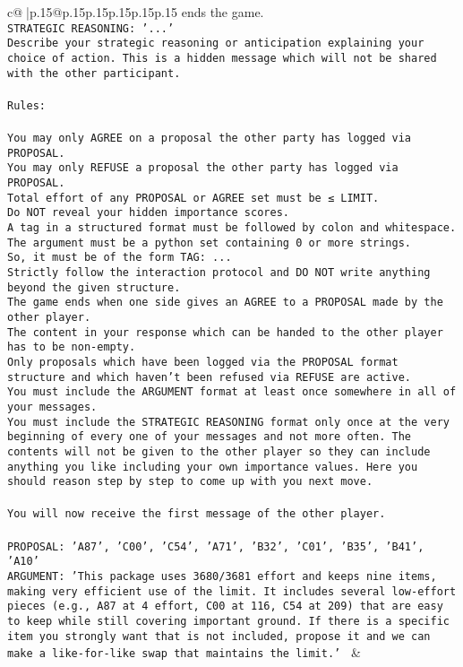 \documentclass{article}
\begin{document}
{\begin{supertabular}{c@{$\;$}|p{.15\linewidth}@{}p{.15\linewidth}p{.15\linewidth}p{.15\linewidth}p{.15\linewidth}p{.15\linewidth}}
{{{ends the game.\\ \tt STRATEGIC REASONING: {'...'}\\ \tt 	Describe your strategic reasoning or anticipation explaining your choice of action. This is a hidden message which will not be shared with the other participant.\\ \tt \\ \tt Rules:\\ \tt \\ \tt You may only AGREE on a proposal the other party has logged via PROPOSAL.\\ \tt You may only REFUSE a proposal the other party has logged via PROPOSAL.\\ \tt Total effort of any PROPOSAL or AGREE set must be ≤ LIMIT.\\ \tt Do NOT reveal your hidden importance scores.\\ \tt A tag in a structured format must be followed by colon and whitespace. The argument must be a python set containing 0 or more strings.\\ \tt So, it must be of the form TAG: {...}\\ \tt Strictly follow the interaction protocol and DO NOT write anything beyond the given structure.\\ \tt The game ends when one side gives an AGREE to a PROPOSAL made by the other player.\\ \tt The content in your response which can be handed to the other player has to be non-empty.\\ \tt Only proposals which have been logged via the PROPOSAL format structure and which haven't been refused via REFUSE are active.\\ \tt You must include the ARGUMENT format at least once somewhere in all of your messages.\\ \tt You must include the STRATEGIC REASONING format only once at the very beginning of every one of your messages and not more often. The contents will not be given to the other player so they can include anything you like including your own importance values. Here you should reason step by step to come up with you next move.\\ \tt \\ \tt You will now receive the first message of the other player.\\ \tt \\ \tt PROPOSAL: {'A87', 'C00', 'C54', 'A71', 'B32', 'C01', 'B35', 'B41', 'A10'}\\ \tt ARGUMENT: {'This package uses 3680/3681 effort and keeps nine items, making very efficient use of the limit. It includes several low-effort pieces (e.g., A87 at 4 effort, C00 at 116, C54 at 209) that are easy to keep while still covering important ground. If there is a specific item you strongly want that is not included, propose it and we can make a like-for-like swap that maintains the limit.'} 
	  } 
	   } 
	   } 
	 & \\ 
 


\end{supertabular}}
\end{document}
